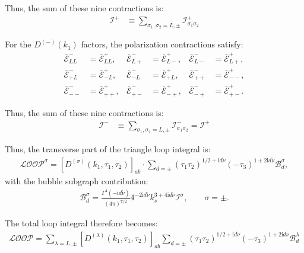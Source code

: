 \documentclass[a4paper,12pt]{article}
\def\mc{\mathcal}
\def\ii{\mathrm{i}}
\def\si{\sigma}
\def\tn{\tilde\nu}
\begin{document}
Thus, the sum of these nine contractions is:
\begin{align}
    \mathcal{I}^{+}
    &\equiv \sum_{\si_1,\si_2=L,\pm} \mathcal{I}^{+}_{\si_1\si_2}
\end{align}

For the $D^{(-)}(k_1)$ factors, the polarization contractions satisfy:
\begin{align}
    \bar{\mathcal{E}}^{-}_{LL} &= \bar{\mathcal{E}}^{+}_{LL}, &
    \bar{\mathcal{E}}^{-}_{L+} &= \bar{\mathcal{E}}^{+}_{L-}, &
    \bar{\mathcal{E}}^{-}_{L-} &= \bar{\mathcal{E}}^{+}_{L+}, \\
    \bar{\mathcal{E}}^{-}_{+L} &= \bar{\mathcal{E}}^{+}_{-L}, &
    \bar{\mathcal{E}}^{-}_{-L} &= \bar{\mathcal{E}}^{+}_{+L}, &
    \bar{\mathcal{E}}^{-}_{++} &= \bar{\mathcal{E}}^{+}_{--}, \\
    \bar{\mathcal{E}}^{-}_{--} &= \bar{\mathcal{E}}^{+}_{++}, &
    \bar{\mathcal{E}}^{-}_{+-} &= \bar{\mathcal{E}}^{+}_{-+}, &
    \bar{\mathcal{E}}^{-}_{-+} &= \bar{\mathcal{E}}^{+}_{+-}.
\end{align}

Thus, the sum of these nine contractions is:
\begin{align}
    \mathcal{I}^{-}
    &\equiv \sum_{\si_1,\si_2=L,\pm} \mathcal{I}^{-}_{\si_1\si_2}
    =\mc I^+
\end{align}

Thus, the transverse part of the triangle loop integral is:
\begin{align}
    \mathcal{LOOP}^{\si}
    =
    \left[D^{(\sigma)}(k_1,\tau_1,\tau_2)\right]_{ab} \cdot
    \sum_{d=\pm}(\tau_1\tau_2)^{1/2+\ii d\tn} (-\tau_3)^{1+2\ii d\tn}
    \mathcal{B}^{\si}_d,
\end{align}
with the bubble subgraph contribution:
\begin{align}
    \mathcal{B}^{\si}_d
    =
    \frac{\Gamma^4(-\ii d\tn)}{(4\pi)^{7/2}}
    4^{-2\ii d\tn}k_s^{3+4\ii d\tn}
    \mathcal{I}^{\si},
    \qquad \sigma=\pm.
\end{align}

The total loop integral therefore becomes:
\begin{align}
    \mathcal{LOOP}
    =
    \sum_{\lambda=L,\pm}
    \left[D^{(\lambda)}(k_1,\tau_1,\tau_2)\right]_{ab}
    \sum_{d=\pm}(\tau_1\tau_2)^{1/2+\ii d\tn} (-\tau_3)^{1+2\ii d\tn}
    \mathcal{B}^{\lambda}_d
\end{align}
\end{document}
